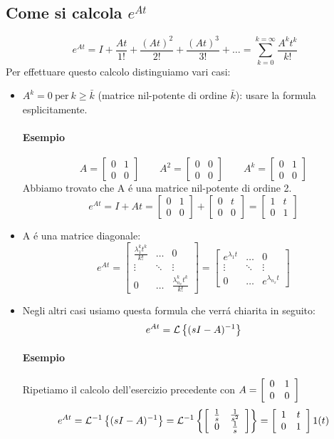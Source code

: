 \documentclass[../main.tex]{subfiles}
\begin{document}
	\subsection{Come si calcola $ e^{At} $}
	\[ e^{At} = I + \frac{At}{1!} + \frac{(At)^2}{2!} + \frac{(At)^3}{3!} + \dots = \sum_{k=0}^{k=\infty} \frac{A^k t^k}{k!} \]
	Per effettuare questo calcolo distinguiamo vari casi:
	\begin{itemize}
		\item $ A^k = 0\ \text{per}\ k \geq \bar k $ (matrice nil-potente di ordine $ \bar k $): usare la formula esplicitamente.\\
		\paragraph{Esempio}
		\[ A = \left[ \begin{array}{cc} 0 & 1\\ 0 & 0 \end{array} \right] \qquad
		   A^2 = \left[ \begin{array}{cc} 0 & 0\\ 0 & 0 \end{array} \right] \qquad
		   A^k = \left[ \begin{array}{cc} 0 & 1\\ 0 & 0 \end{array} \right] \]
		Abbiamo trovato che A \'e una matrice nil-potente di ordine 2.
		\[ e^{At} = I + At = \left[ \begin{array}{cc} 0 & 1\\ 0 & 0 \end{array} \right] + \left[ \begin{array}{cc} 0 & t\\ 0 & 0 \end{array} \right] = \left[ \begin{array}{cc} 1 & t\\ 0 & 1 \end{array} \right] \]
		\item A \'e una matrice diagonale:
		\[ e^{At} = \left[ \begin{array}{ccc} \frac{\lambda_1^k t^k}{k!} & \dots & 0\\ \vdots & \ddots & \vdots\\ 0 & \dots & \frac{\lambda_{n_x}^k t^k}{k!} \end{array} \right] = 
		\left[ \begin{array}{ccc} e^{\lambda_1 t} & \dots & 0\\ \vdots & \ddots & \vdots\\ 0 & \dots & e^{\lambda_{n_x} t} \end{array} \right] \]
		\item Negli altri casi usiamo questa formula che verr\'a chiarita in seguito:
		\[ e^{At} = \mathcal{L} \left\lbrace (sI-A)^{-1} \right\rbrace \]
		\paragraph{Esempio}
		Ripetiamo il calcolo dell'esercizio precedente con $ A = \left[ \begin{array}{cc} 0 & 1\\ 0 & 0 \end{array} \right] $
		\[ e^{At} = \mathcal{L}^{-1} \left\lbrace (sI-A)^{-1} \right\rbrace = \mathcal{L}^{-1} \left\lbrace \left[ \begin{array}{cc} \frac{1}{s} & \frac{1}{s^2}\\ 0 & \frac{1}{s} \end{array} \right] \right\rbrace = \left[ \begin{array}{cc} 1 & t\\ 0 & 1 \end{array} \right] 1(t) \]
	\end{itemize}
\end{document}
